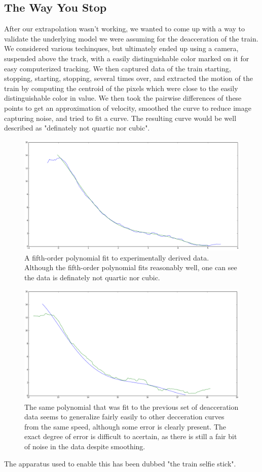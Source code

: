 \documentclass[titlepage]{article}
\begin{document}
\subsection{The Way You Stop}
After our extrapolation wasn't working, we wanted to come up with a way to
validate the underlying model we were assuming for the deacceration of the
train. We considered various techinques, but ultimately ended up using a
camera, suspended above the track, with a easily distinguishable color marked
on it for easy computerized tracking. We then captured data of the train
starting, stopping, starting, stopping, several times over, and extracted
the motion of the train by computing the centroid of the pixels which were
close to the easily distinguishable color in value. We then took the pairwise
differences of these points to get an approximation of velocity, smoothed the
curve to reduce image capturing noise, and tried to fit a curve. The resulting
curve would be well described as "definately not quartic nor cubic".
\begin{figure}[ht!]
\includegraphics[width=\linewidth]{deaccel.png}
\caption{A fifth-order polynomial fit to experimentally derived data. Although
the fifth-order polynomial fits reasonably well, one can see the data is
definately not quartic nor cubic.}
\end{figure}
\begin{figure}[ht!]
\includegraphics[width=\linewidth]{deaccel2.png}
\caption{The same polynomial that was fit to the previous set of deacceration
data seems to generalize fairly easily to other decceration curves from the
same speed, although some error is clearly present. The exact degree of error
is difficult to acertain, as there is still a fair bit of noise in the data
despite smoothing.}
\end{figure}
The apparatus used to enable this has been dubbed "the
train selfie stick".
\end{document}
